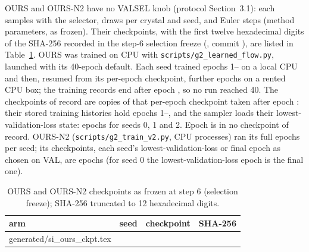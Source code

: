 \documentclass[journal=acsodf,manuscript=article]{achemso}
\makeatletter
\newcommand{\inputrows}[1]{\@@input #1 }
\makeatother
\begin{document}
OURS and OURS-N2 have no VALSEL knob (protocol Section~3.1): each samples with the
\svOursSel{} selector, \svOursS{} draws per crystal and seed, and \svOursEuler{} Euler steps
(method parameters, as frozen). Their
checkpoints, with the first twelve hexadecimal digits of the SHA-256 recorded in the step-6
selection freeze (\svSelSha, commit \svSelCommit), are listed in Table~\ref{tab:si_ours_ckpt}.
OURS was trained on CPU with \texttt{scripts/g2\_learned\_flow.py}, launched with its 40-epoch
default. Each seed trained epochs 1--\svOursLocalEpochs{} on a local CPU and then, resumed from
its per-epoch checkpoint, further epochs on a rented CPU box; the training records end after
epoch \svOursRanEpochs, so no run reached 40. The checkpoints of record are copies of that
per-epoch checkpoint taken after epoch \svOursEpochs: their stored training histories hold
epochs 1--\svOursEpochs, and the sampler loads their lowest-validation-loss state: epochs
\svOursBestEpochs{} for seeds 0, 1 and 2. Epoch \svOursRanEpochs{} is in no checkpoint
of record. OURS-N2 (\texttt{scripts/g2\_train\_v2.py}, \svTrainNTwoProcs{} CPU processes) ran
its full \svOursNTwoEpochs{} epochs per seed; its checkpoints, each seed's
lowest-validation-loss or final epoch as chosen on VAL, are epochs \svOursNTwoChosen{} (for
seed 0 the lowest-validation-loss epoch is the final one).

\begin{table}[htbp]
\caption{OURS and OURS-N2 checkpoints as frozen at step 6 (selection freeze); SHA-256
truncated to 12 hexadecimal digits.}
\label{tab:si_ours_ckpt}
\centering
\small
\begin{tabular}{@{}llll@{}}
\toprule
arm & seed & checkpoint & SHA-256 \\
\midrule
\inputrows{generated/si_ours_ckpt.tex}
\bottomrule
\end{tabular}
\end{table}
\end{document}
